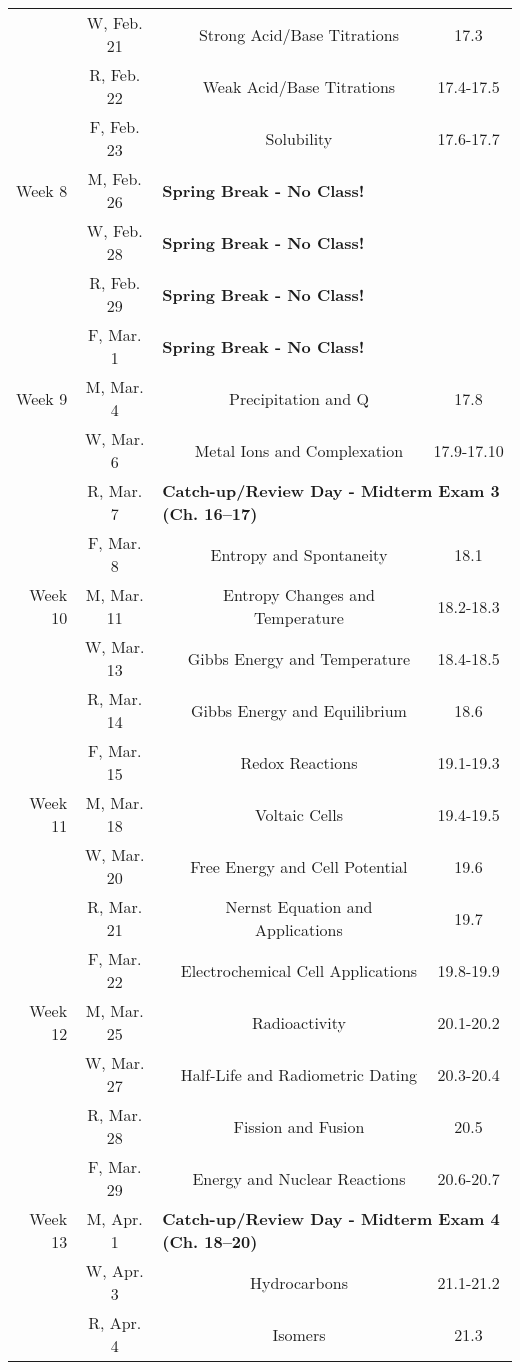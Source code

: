 \begin{tabular}{rcccc}
& W, Feb. 21&& Strong Acid/Base Titrations & 17.3\\
& R, Feb. 22&& Weak Acid/Base Titrations & 17.4-17.5\\
& F, Feb. 23&& Solubility & 17.6-17.7\\
\midrule
Week 8 & M, Feb. 26& \multicolumn{3}{l}{\textbf{Spring Break - No Class!}}\\
& W, Feb. 28& \multicolumn{3}{l}{\textbf{Spring Break - No Class!}}\\
& R, Feb. 29& \multicolumn{3}{l}{\textbf{Spring Break - No Class!}}\\
& F, Mar. 1& \multicolumn{3}{l}{\textbf{Spring Break - No Class!}}\\
\midrule
Week 9 & M, Mar. 4&& Precipitation and Q & 17.8\\
& W, Mar. 6&& Metal Ions and Complexation & 17.9-17.10\\
& R, Mar. 7& \multicolumn{3}{l}{\textbf{Catch-up/Review Day - Midterm Exam 3 (Ch. 16--17)}}\\
& F, Mar. 8&& Entropy and Spontaneity & 18.1\\
\midrule
Week 10 & M, Mar. 11&& Entropy Changes and Temperature & 18.2-18.3\\
& W, Mar. 13&& Gibbs Energy and Temperature & 18.4-18.5\\
& R, Mar. 14&& Gibbs Energy and Equilibrium & 18.6\\
& F, Mar. 15&& Redox Reactions & 19.1-19.3\\
\midrule
Week 11 & M, Mar. 18&& Voltaic Cells & 19.4-19.5\\
& W, Mar. 20&& Free Energy and Cell Potential & 19.6\\
& R, Mar. 21&& Nernst Equation and Applications & 19.7\\
& F, Mar. 22&& Electrochemical Cell Applications & 19.8-19.9\\
\midrule
Week 12 & M, Mar. 25&& Radioactivity & 20.1-20.2\\
& W, Mar. 27&& Half-Life and Radiometric Dating & 20.3-20.4\\
& R, Mar. 28&& Fission and Fusion & 20.5\\
& F, Mar. 29&& Energy and Nuclear Reactions & 20.6-20.7\\
\midrule
Week 13 & M, Apr. 1& \multicolumn{3}{l}{\textbf{Catch-up/Review Day - Midterm Exam 4 (Ch. 18--20)}}\\
& W, Apr. 3&& Hydrocarbons & 21.1-21.2\\
& R, Apr. 4&& Isomers & 21.3\\

\end{tabular}
